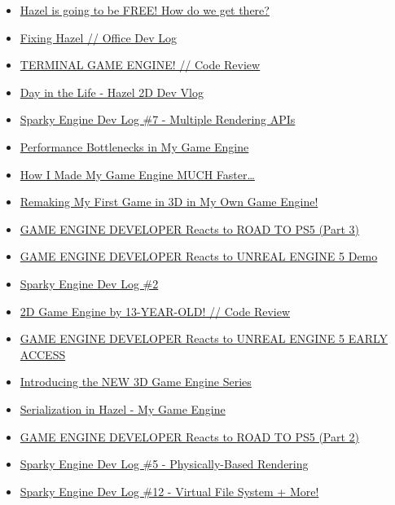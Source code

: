 \begin{itemize}
\tightlist
\item
  \href{https://www.youtube.com/watch?v=_kEO7kreWnU}{Hazel is going to be FREE! How do we get there?}
\item
  \href{https://www.youtube.com/watch?v=IHUUkkLUX1U}{Fixing Hazel // Office Dev Log}
\item
  \href{https://www.youtube.com/watch?v=B6pM9KcIFE4}{TERMINAL GAME ENGINE! // Code Review}
\item
  \href{https://www.youtube.com/watch?v=2njnCUau3zk}{Day in the Life - Hazel 2D Dev Vlog}
\item
  \href{https://www.youtube.com/watch?v=yGggmfDGGv0}{Sparky Engine Dev Log \#7 - Multiple Rendering APIs}
\item
  \href{https://www.youtube.com/watch?v=ZNqSTHU5fGA}{Performance Bottlenecks in My Game Engine}
\item
  \href{https://www.youtube.com/watch?v=ddfMzq0CNTw}{How I Made My Game Engine MUCH Faster\ldots{}}
\item
  \href{https://www.youtube.com/watch?v=um7OkTKy7Dc}{Remaking My First Game in 3D in My Own Game Engine!}
\item
  \href{https://www.youtube.com/watch?v=ESQyAhooBLM}{GAME ENGINE DEVELOPER Reacts to ROAD TO PS5 (Part 3)}
\item
  \href{https://www.youtube.com/watch?v=9PmjQvowfAI}{GAME ENGINE DEVELOPER Reacts to UNREAL ENGINE 5 Demo}
\item
  \href{https://www.youtube.com/watch?v=fm1MkcIHTFY}{Sparky Engine Dev Log \#2}
\item
  \href{https://www.youtube.com/watch?v=9HCboZHTyrw}{2D Game Engine by 13-YEAR-OLD! // Code Review}
\item
  \href{https://www.youtube.com/watch?v=nyZnRxvSJrY}{GAME ENGINE DEVELOPER Reacts to UNREAL ENGINE 5 EARLY ACCESS}
\item
  \href{https://www.youtube.com/watch?v=-paLdjChPxo}{Introducing the NEW 3D Game Engine Series}
\item
  \href{https://www.youtube.com/watch?v=EK4QSO_qO9Q}{Serialization in Hazel - My Game Engine}
\item
  \href{https://www.youtube.com/watch?v=v1SRHrCa4XQ}{GAME ENGINE DEVELOPER Reacts to ROAD TO PS5 (Part 2)}
\item
  \href{https://www.youtube.com/watch?v=zqmgcQd6ayc}{Sparky Engine Dev Log \#5 - Physically-Based Rendering}
\item
  \href{https://www.youtube.com/watch?v=93qsNih8jBA}{Sparky Engine Dev Log \#12 - Virtual File System + More!}

\end{itemize}
